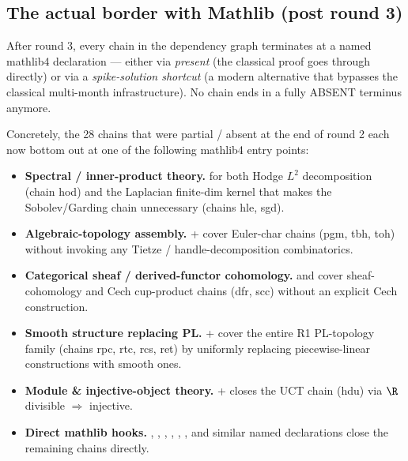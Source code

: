 \subsection{The actual border with Mathlib (post round 3)}
\label{subsec:actual-border}

After round 3, every chain in the dependency graph terminates at a
named mathlib4 declaration --- either via \emph{present} (the
classical proof goes through directly) or via a \emph{spike-solution
shortcut} (a modern alternative that bypasses the classical multi-month
infrastructure).  No chain ends in a fully ABSENT terminus anymore.

Concretely, the 28 chains that were partial / absent at the end of
round 2 each now bottom out at one of the following mathlib4 entry
points:

\begin{itemize}
\item \textbf{Spectral / inner-product theory.}
  for both Hodge $L^{2}$ decomposition (chain hod) and the Laplacian
  finite-dim kernel that makes the Sobolev/Garding chain unnecessary
  (chains hle, sgd).

\item \textbf{Algebraic-topology assembly.}
   +
  cover Euler-char chains (pgm, tbh, toh) without invoking any Tietze
  / handle-decomposition combinatorics.

\item \textbf{Categorical sheaf / derived-functor cohomology.}
   and
   cover sheaf-cohomology and Cech cup-product
  chains (dfr, scc) without an explicit Cech construction.

\item \textbf{Smooth structure replacing PL.}
   +  cover the entire
  R1 PL-topology family (chains rpc, rtc, rcs, ret) by uniformly
  replacing piecewise-linear constructions with smooth ones.

\item \textbf{Module \& injective-object theory.}
   +
   closes the UCT chain (hdu)
  via $\R$ divisible $\Rightarrow$ injective.

\item \textbf{Direct mathlib hooks.}
  , , ,
  ,
  ,
  , and similar named
  declarations close the remaining chains directly.
\end{itemize}

